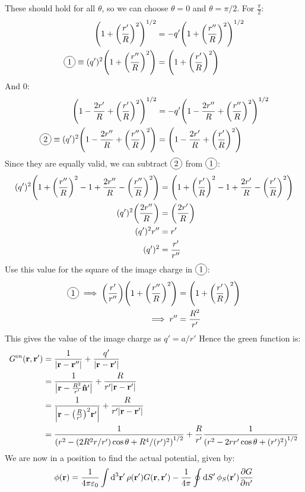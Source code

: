 \documentclass[12pt]{article}
\newcommand{\circled}[1]{\tikz[baseline=(char.base)]{
    \node[shape=circle,draw,inner sep=2pt](char){#1};}}
\begin{document}
These should hold for all $\theta$, so we can choose $\theta=0$ and $\theta=\pi/2$. For $\frac\pi2$:
\begin{align*}
  \qty(1+\qty(\frac{r'}R)^2)^{1/2}&=-q'\qty(1+\qty(\frac{r''}R)^2)^{1/2}\\
  \circled{1}\equiv
  (q')^2\qty(1+\qty(\frac{r''}R)^2)&=\qty(1+\qty(\frac{r'}R)^2)
\end{align*}
And $0$:
\begin{align*}
  \qty(1-\frac{2r'}R+\qty(\frac{r'}R)^2)^{1/2}&=
  -q'\qty(1-\frac{2r''}R+\qty(\frac{r''}R)^2)^{1/2}\\
  \circled{2}\equiv
  (q')^2\qty(1-\frac{2r''}R+\qty(\frac{r''}R)^2)&=
  \qty(1-\frac{2r'}R+\qty(\frac{r'}R)^2)
\end{align*}
Since they are equally valid, we can subtract $\circled{2}$ from $\circled{1}$:
\begin{align*}
  (q')^2\qty(1+\qty(\frac{r''}R)^2-1+\frac{2r''}{R}-\qty(\frac{r''}R)^2)&=
  \qty(1+\qty(\frac{r'}R)^2-1+\frac{2r'}R-\qty(\frac{r'}R)^2)\\
  (q')^2\qty(\frac{2r''}{R})&=\qty(\frac{2r'}R)\\
  (q')^2r''&=r'\\
  (q')^2&=\frac{r'}{r''}
\end{align*}
Use this value for the square of the image charge in $\circled{1}$:
\begin{align*}
  \circled{1}\implies
  \qty(\frac{r'}{r''})\qty(1+\qty(\frac{r''}R)^2)&=\qty(1+\qty(\frac{r'}R)^2)\\
  \implies r''&=\frac{R^2}{r'}
\end{align*}
This gives the value of the image charge as $q'=a/r'$
Hence the green function is:
\begin{align*}
  G^{in}(\vb{r,r}')&=\frac1{\abs{\vb{r-r}''}}+\frac{q'}{\abs{\vb{r-r}'}}\\
  &=\frac1{\abs{\vb{r}-\frac{R^2}{r'}\vu{n}'}}+\frac{R}{r'\abs{\vb{r-r}'}}\\
  &=\frac1{\abs{\vb{r}-\qty(\frac{R}{r'})^2\vb{r}'}}
  +\frac{R}{r'\abs{\vb{r-r}'}}\\
  &=\frac1{\qty(r^2-(2R^2r/r')\cos\theta+R^4/(r')^2)^{1/2}}+
  \frac{R}{r'}\frac1{\qty(r^2-2rr'\cos\theta+(r')^2)^{1/2}}
\end{align*}
We are now in a position to find the actual potential, given by:
\begin{align*}
  \phi(\vb{r})=\frac1{4\pi\varepsilon_0}
  \int\dd[3]{\vb{r}'}\rho(\vb{r}')G(\vb{r,r}')
  -\frac1{4\pi}\oint\dd{S'}\phi_S(\vb{r}')\pdv{G}{n'}
\end{align*}
\end{document}
